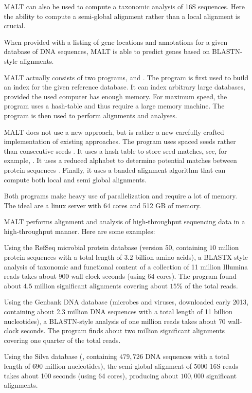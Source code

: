\documentclass[11pt]{article}
\newcommand\MALT{{\sf MALT}\xspace}
\begin{document}
{
\MALT can also be used to compute a taxonomic analysis of 16S sequences. Here the
ability to compute a semi-global alignment rather than a local alignment is crucial.

When provided with a listing of gene locations and annotations for a given database of DNA sequences, \MALT is able to predict genes based on BLASTN-style alignments.
}

\MALT actually consists of two programs,  and
.
The  program is first used to build an index for the given reference database. It
can index arbitrary large databases, provided the used computer has enough memory.
For maximum speed, the program uses a hash-table and thus require a large memory machine.
The    program is then used to perform alignments and analyses.

\MALT does not use a new approach, but is rather a new carefully crafted implementation of existing approaches.
The program uses spaced seeds rather than consecutive seeds \cite{Burkhardt01,Ma02}.
It uses a hash table to store seed matches, see, for example, \cite{SSAHA}.
 It uses a reduced alphabet to determine potential matches between protein sequences \cite{Murphy2000,RapSearch2}.
 Finally, it uses a banded alignment algorithm \cite{ChaoPM92} that can compute both local and semi global alignments.

Both programs make heavy use of parallelization and require a lot of memory. The ideal 
are a linux server with 64 cores and 512 GB of memory.

\MALT  performs alignment and analysis of high-throughput sequencing data in a high-throughput manner. Here are some examples:

\begin{enumerate}
\item
Using the RefSeq microbial protein database (version 50, containing $10$ million protein sequences with a total length of $3.2$ billion amino acids), a BLASTX-style analysis of taxonomic and functional content of
a collection of 11 million Illumina reads takes about $900$ wall-clock seconds (using 64 cores).
The program found about $4.5$ million significant alignments covering about $15$\% of the total reads.
{
\item Using the Genbank DNA database (microbes and viruses,
downloaded early 2013, containing about 2.3 million DNA sequences with a total length of 
11 billion nucleotides), a BLASTN-style analysis of one million reads takes about $70$ wall-clock seconds. 
The program finds about two million  significant alignments covering one quarter of the total reads.
\item Using the Silva database (, containing $479,726$ DNA sequences with a total length of  $690$ million nucleotides), the semi-global alignment of $5000$ 16S reads takes about 100 seconds (using 64 cores), producing
about $100,000$ significant alignments. 
}
\end{enumerate}
\end{document}
